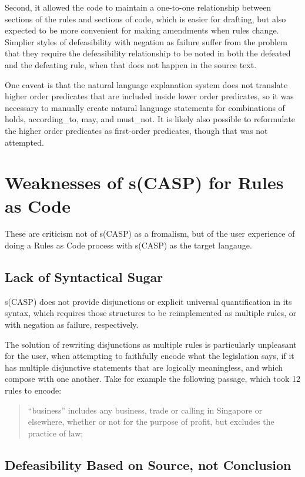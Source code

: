\documentclass[sigconf]{acmart}
\begin{document}
Second, it allowed the code to maintain a one-to-one relationship between sections of the rules and
sections of code, which is easier for drafting, but also expected to be more convenient for making amendments
when rules change.  Simplier styles of defeasibility with negation as failure suffer from the problem that
they require the defeasibility relationship to be noted in both the defeated and the defeating rule, when
that does not happen in the source text.

One caveat is that the natural language explanation system does not translate higher order predicates that
are included inside lower order predicates, so it was necessary to manually create natural language statements
for combinations of holds, according\_to, may, and must\_not. It is likely also
possible to reformulate the higher order predicates as first-order predicates,
though that was not attempted.

\section{Weaknesses of s(CASP) for Rules as Code}

These are criticism not of s(CASP) as a fromalism, but of the user experience
of doing a Rules as Code process with s(CASP) as the target langauge.

\subsection{Lack of Syntactical Sugar}
s(CASP) does not provide disjunctions or explicit universal quantification in its syntax, which requires those structures
to be reimplemented as multiple rules, or with negation as failure, respectively.

The solution of rewriting disjunctions as multiple rules is particularly unpleasant for the user,
when attempting to faithfully encode what the legislation says, if it has multiple 
disjunctive statements that are logically meaningless, and which compose with one another. Take for example the following
passage, which took 12 rules to encode:
\begin{quote}
“business” includes any business, trade or calling in Singapore or elsewhere, whether or not for the purpose of profit, but excludes the practice of law;
\end{quote}

\subsection{Defeasibility Based on Source, not Conclusion}
\end{document}
